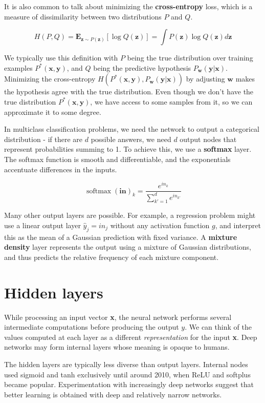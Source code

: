 \documentclass{article}
\DeclareMathOperator*{\softmax}{softmax}
\begin{document}
It is also common to talk about minimizing the \textbf{cross-entropy} loss, which is
a measure of dissimilarity between two distributions $P$ and $Q$.

\[
H(P, Q) = \textbf{E}_{\textbf{z} \sim P(\textbf{z})} [\log Q(\textbf{z})] = \int P(\textbf{z}) \log Q(\textbf{z}) d\textbf{z}
\]

We typically use this definition with $P$ being the true distribution over training
examples $P^*(\textbf{x}, \textbf{y})$, and $Q$ being the predictive hypothesis
$P_{\textbf{w}}(\textbf{y} | \textbf{x})$. Minimizing the cross-entropy
$H(P^*(\textbf{x}, \textbf{y}), P_{\textbf{w}}(\textbf{y} | \textbf{x}))$ by adjusting
$\textbf{w}$ makes the hypothesis agree with the true distribution. Even though we
don't have the true distribution $P^*(\textbf{x}, \textbf{y})$, we have access to
some samples from it, so we can approximate it to some degree.

In multiclass classification problems, we need the network to output a categorical
distribution - if there are $d$ possible answers, we need $d$ output nodes that
represent probabilities summing to 1. To achieve this, we use a \textbf{softmax}
layer. The softmax function is smooth and differentiable, and the exponentials
accentuate differences in the inputs. 

\[
\softmax(\textbf{in})_k = \frac{e^{in_k}}{\sum_{k'=1}^d e^{in_{k'}}}
\]

Many other output layers are possible. For example, a regression problem might use a
linear output layer $\hat y_j = in_j$ without any activation function $g$, and
interpret this as the mean of a Gaussian prediction with fixed variance. A
\textbf{mixture density} layer represents the output using a mixture of Gaussian
distributions, and thus predicts the relative frequency of each mixture component.

\section{Hidden layers}

While processing an input vector \textbf{x}, the neural network performs several
intermediate computations before producing the output $y$. We can think of the
values computed at each layer as a different {\em representation} for the input \textbf{x}.
Deep networks may form internal layers whose meaning is opaque to humans.

The hidden layers are typically less diverse than output layers. Internal nodes used
sigmoid and tanh exclusively until around 2010, when ReLU and softplus became popular.
Experimentation with increasingly deep networks suggest that better learning is obtained
with deep and relatively narrow networks.
\end{document}
